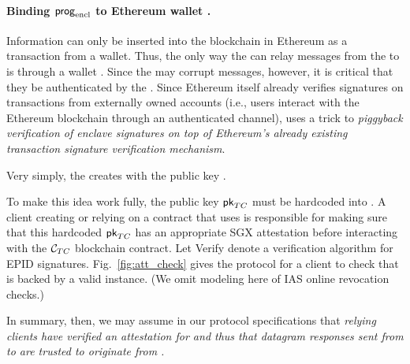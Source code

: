 \paragraph{Binding ${\sf prog}_{\textrm{encl}}$ to Ethereum wallet \tcadd.}
Information can only be inserted into the blockchain in Ethereum as a transaction from a wallet. Thus, the only way the \medname can relay messages from the \encname to \tcont is through a wallet \tcadd. Since the \medname may corrupt messages, however, it is critical that they be authenticated by the \encname. Since Ethereum itself 
already verifies signatures on transactions from externally owned accounts (i.e., users interact with the  Ethereum blockchain through an authenticated channel), \tc uses a trick to {\it piggyback verification of enclave signatures on top of Ethereum's already existing transaction signature verification mechanism}. 

Very simply, the \encname creates \tcadd with the public key \pkTC. 

To make this idea work fully, the public key ${\sf pk}_{TC}$ must be hardcoded into \tcont. A client creating or relying on a contract that uses \tcont is responsible for making sure that this hardcoded ${\sf pk}_{TC}$ has an appropriate SGX attestation before interacting with the ${\cal C}_{TC}$  blockchain contract.  Let {\sf Verify} denote a verification algorithm for EPID signatures. Fig.~\ref{fig:att_check} gives the protocol for a client to check that \tcont is backed by a valid \encname instance. (We omit modeling here of IAS online revocation checks.)


In summary, then, we may assume in our protocol specifications that {\em relying clients have verified an attestation for \encname and thus that datagram responses sent from \tcadd to \tcont are trusted to originate from \engine.} 



